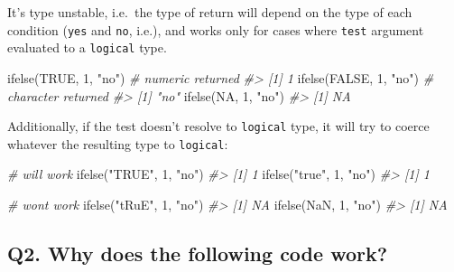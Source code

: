 \documentclass[
]{book}
\newenvironment{Shaded}{\begin{snugshade}}{\end{snugshade}}
\newcommand{\CommentTok}[1]{\textcolor[rgb]{0.56,0.35,0.01}{\textit{#1}}}
\newcommand{\ConstantTok}[1]{\textcolor[rgb]{0.00,0.00,0.00}{#1}}
\newcommand{\DecValTok}[1]{\textcolor[rgb]{0.00,0.00,0.81}{#1}}
\newcommand{\FunctionTok}[1]{\textcolor[rgb]{0.00,0.00,0.00}{#1}}
\newcommand{\NormalTok}[1]{#1}
\newcommand{\StringTok}[1]{\textcolor[rgb]{0.31,0.60,0.02}{#1}}
\begin{document}
It's type unstable, i.e.~the type of return will depend on the type of each condition (\texttt{yes} and \texttt{no}, i.e.), and works only for cases where \texttt{test} argument evaluated to a \texttt{logical} type.

\begin{Shaded}
\begin{Highlighting}[]
\FunctionTok{ifelse}\NormalTok{(}\ConstantTok{TRUE}\NormalTok{, }\DecValTok{1}\NormalTok{, }\StringTok{"no"}\NormalTok{) }\CommentTok{\# numeric returned}
\CommentTok{\#\textgreater{} [1] 1}
\FunctionTok{ifelse}\NormalTok{(}\ConstantTok{FALSE}\NormalTok{, }\DecValTok{1}\NormalTok{, }\StringTok{"no"}\NormalTok{) }\CommentTok{\# character returned}
\CommentTok{\#\textgreater{} [1] "no"}
\FunctionTok{ifelse}\NormalTok{(}\ConstantTok{NA}\NormalTok{, }\DecValTok{1}\NormalTok{, }\StringTok{"no"}\NormalTok{)}
\CommentTok{\#\textgreater{} [1] NA}
\end{Highlighting}
\end{Shaded}

Additionally, if the test doesn't resolve to \texttt{logical} type, it will try to coerce whatever the resulting type to \texttt{logical}:

\begin{Shaded}
\begin{Highlighting}[]
\CommentTok{\# will work}
\FunctionTok{ifelse}\NormalTok{(}\StringTok{"TRUE"}\NormalTok{, }\DecValTok{1}\NormalTok{, }\StringTok{"no"}\NormalTok{)}
\CommentTok{\#\textgreater{} [1] 1}
\FunctionTok{ifelse}\NormalTok{(}\StringTok{"true"}\NormalTok{, }\DecValTok{1}\NormalTok{, }\StringTok{"no"}\NormalTok{)}
\CommentTok{\#\textgreater{} [1] 1}

\CommentTok{\# won\textquotesingle{}t work}
\FunctionTok{ifelse}\NormalTok{(}\StringTok{"tRuE"}\NormalTok{, }\DecValTok{1}\NormalTok{, }\StringTok{"no"}\NormalTok{)}
\CommentTok{\#\textgreater{} [1] NA}
\FunctionTok{ifelse}\NormalTok{(}\ConstantTok{NaN}\NormalTok{, }\DecValTok{1}\NormalTok{, }\StringTok{"no"}\NormalTok{)}
\CommentTok{\#\textgreater{} [1] NA}
\end{Highlighting}
\end{Shaded}

\hypertarget{q2.-why-does-the-following-code-work}{%
\subsection*{Q2. Why does the following code work?}\label{q2.-why-does-the-following-code-work}}
\end{document}
